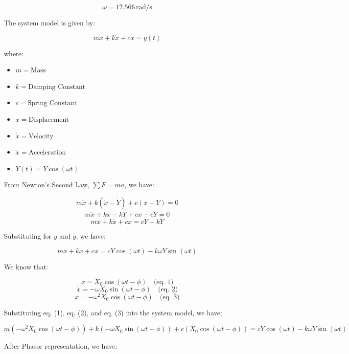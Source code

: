 \documentclass[12pt,a4paper]{article}
\begin{document}
\[
\omega = 12.566 \, \text{rad/s}
\]

The system model is given by:

\[
m \ddot{x}  + k \dot{x} + c x = y(t)
\]

where:
\begin{itemize}
    \item \( m = \text{Mass} \)
    \item \( k = \text{Damping Constant} \)
    \item \( c = \text{Spring Constant} \)
    \item \( x = \text{Displacement} \)
    \item \( \dot{x} = \text{Velocity} \)
    \item \( \ddot{x} = \text{Acceleration} \)
    \item \( Y(t) = Y \cos(\omega t) \)
\end{itemize}

{\vspace{5pt}}

From Newton's Second Law, \( \sum F = ma \), we have:

\[
m \ddot{x} + k (\dot{x} - \dot{Y}) + c(x - Y) = 0
\]
\[
m \ddot{x} + k \dot{x} - k \dot{Y} + c x - cY = 0
\]
\[
m \ddot{x} + k \dot{x} + c x = c Y + k \dot{Y}
\]

{\vspace{5pt}}

Substituting for \( y \) and \( \dot{y} \), we have:

\[
m \ddot{x} + k \dot{x} + c x = c Y \cos(\omega t) - k \omega Y \sin(\omega t)
\]

{\vspace{5pt}}

We know that:

\[
x = X_0 \cos(\omega t - \phi) \quad \text{(eq. 1)}
\]
\[
\dot{x} = -\omega X_0 \sin(\omega t - \phi) \quad \text{(eq. 2)}
\]
\[
\ddot{x} = -\omega^2 X_0 \cos(\omega t - \phi) \quad \text{(eq. 3)}
\]

{\vspace{5pt}}

Substituting eq. (1), eq. (2), and eq. (3) into the system model, we have:

\[
m (-\omega^2 X_0 \cos(\omega t - \phi)) + k (-\omega X_0 \sin(\omega t - \phi)) + c (X_0 \cos(\omega t - \phi)) = c Y \cos(\omega t) - k \omega Y \sin(\omega t)
\]

{\vspace{5pt}}

After Phasor representation, we have:
\end{document}
